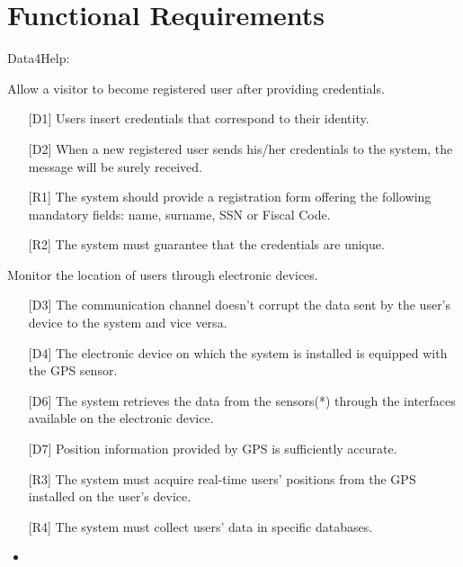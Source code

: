 \section{Functional Requirements}
Data4Help:  
\begin{enumerate} [label={[G\arabic*]}]
    \item Allow a visitor to become registered user after providing credentials.
        \begin{itemize}
            \item [{[D1]}] Users insert credentials that correspond to their identity.
            \item [{[D2]}] When a new registered user sends his/her credentials to the system, the message will be surely received.
            \item [{[R1]}] The system should provide a registration form offering the following mandatory fields: name, surname, SSN or Fiscal Code.
            \item [{[R2]}] The system must guarantee that the credentials are unique.
        \end{itemize}
        
    \item Monitor the location of users through electronic devices.
        \begin{itemize}
            \item [{[D3]}] The communication channel doesn't corrupt the data sent by the user's device to the system and vice versa.
            \item [{[D4]}] The electronic device on which the system is installed is equipped with the GPS sensor.
            \item [{[D6]}] The  system  retrieves  the  data  from  the  sensors(*)  through  the  interfaces available on the electronic device.
            \item [{[D7]}] Position information provided by GPS is sufficiently accurate.
            \item [{[R3]}] The system must acquire real-time users' positions from the GPS installed on the user's device.
            \item [{[R4]}] The system must collect users' data in specific databases.
            \item 
        \end{itemize}
        

\end{enumerate}

